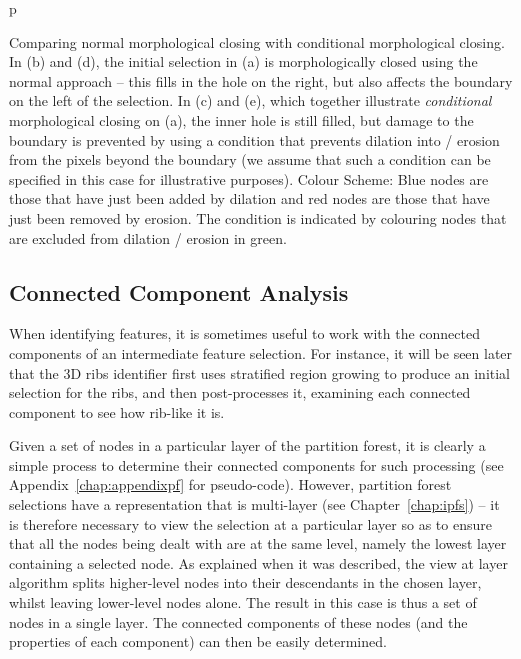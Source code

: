 \begin{stusubfig}{p}
\caption[Comparing normal morphological closing with conditional morphological closing]{Comparing normal morphological closing with conditional morphological closing. In (b) and (d), the initial selection in (a) is morphologically closed using the normal approach -- this fills in the hole on the right, but also affects the boundary on the left of the selection. In (c) and (e), which together illustrate \emph{conditional} morphological closing on (a), the inner hole is still filled, but damage to the boundary is prevented by using a condition that prevents dilation into / erosion from the pixels beyond the boundary (we assume that such a condition can be specified in this case for illustrative purposes). Colour Scheme: Blue nodes are those that have just been added by dilation and red nodes are those that have just been removed by erosion. The condition is indicated by colouring nodes that are excluded from dilation / erosion in green.}
\label{fig:featureid-techniques-conditionalclosing}
\end{stusubfig}


\subsection{Connected Component Analysis}


When identifying features, it is sometimes useful to work with the connected components of an intermediate feature selection. For instance, it will be seen later that the 3D ribs identifier first uses stratified region growing to produce an initial selection for the ribs, and then post-processes it, examining each connected component to see how rib-like it is.

Given a set of nodes in a particular layer of the partition forest, it is clearly a simple process to determine their connected components for such processing (see Appendix~\ref{chap:appendixpf} for pseudo-code). However, partition forest selections have a representation that is multi-layer (see Chapter~\ref{chap:ipfs}) -- it is therefore necessary to view the selection at a particular layer so as to ensure that all the nodes being dealt with are at the same level, namely the lowest layer containing a selected node. As explained when it was described, the view at layer algorithm splits higher-level nodes into their descendants in the chosen layer, whilst leaving lower-level nodes alone. The result in this case is thus a set of nodes in a single layer. The connected components of these nodes (and the properties of each component) can then be easily determined.


